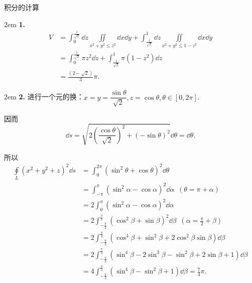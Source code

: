 \documentclass[UTF8,14pt,normal]{ctexart}
\begin{document}
\clearpage
{} 积分的计算

    \hangindent 2em
    \noindent
    \textbf{1.}
    \begin{equation*}
        \begin{split}
            V &= \int_{0}^{\frac{1}{\sqrt{2}}}\dd{z}\iint\limits_{x^2+y^2\leqslant z^2}\dd{x}\dd{y}+\int_{\frac{1}{\sqrt{2}}}^{1}\dd{z}\iint\limits_{x^2+y^2\leqslant 1-z^2}\dd{x}\dd{y}\\
            &= \int_{0}^{\frac{1}{\sqrt{2}}}\pi z^2\dd{z}+\int_{\frac{1}{\sqrt{2}}}^{1}\pi (1-z^2)\dd{z}\\
            &= \frac{(2-\sqrt{2})}{3}\pi.
        \end{split}
    \end{equation*}

    \hangindent 2em
    \noindent
    \textbf{2.}
    进行一个元的换：\(x=y=\dfrac{\sin\theta}{\sqrt{2}},z = \cos\theta,\theta\in[0,2\pi]\).

    因而\[\dd{s} = \sqrt{2\left(\dfrac{\cos\theta}{\sqrt{2}}\right)^2+(-\sin \theta)^2}\dd{\theta} = \dd{\theta}.\]

    所以
    \begin{equation*}
        \begin{split}
            \oint\limits_{L}(x^2+y^2+z)^2\dd{s} &= \int_{0}^{2\pi}(\sin^2\theta+\cos\theta)^2\dd{\theta}\\
            &= \int_{-\pi}^{\pi}(\sin^2\alpha-\cos\alpha)^2\dd{\alpha}\enspace(\theta = \pi+\alpha)\\
            &= 2\int_{0}^{\pi}(\sin^2\alpha-\cos\alpha)^2\dd{\alpha}\\
            &= 2\int_{-\frac{\pi}{2}}^{\frac{\pi}{2}}(\cos^2\beta+\sin\beta)^2\dd{\beta}\enspace(\alpha = \frac{\pi}{2}+\beta)\\
            &= 2\int_{-\frac{\pi}{2}}^{\frac{\pi}{2}}(\cos^4\beta+\sin^2\beta+2\cos^2\beta\sin\beta)\dd{\beta}\\
            &= 2\int_{-\frac{\pi}{2}}^{\frac{\pi}{2}}(\sin^4\beta-2\sin^3\beta-\sin^2\beta+2\sin\beta+1)\dd{\beta}\\
            &= 4\int_{-\frac{\pi}{2}}^{\frac{\pi}{2}}(\sin^4\beta-\sin^2\beta+1)\dd{\beta} = \frac{7}{4}\pi.
        \end{split}
    \end{equation*}
\end{document}
